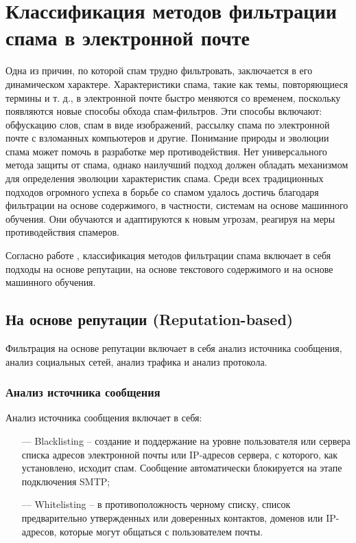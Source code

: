 \section{Классификация методов фильтрации спама в электронной почте}\label{Section:Filtering}

Одна из причин, по которой спам трудно фильтровать, заключается в
его динамическом характере. Характеристики спама, такие как темы,
повторяющиеся термины и т. д., в электронной почте быстро меняются
со временем, поскольку появляются новые способы обхода спам-фильтров.
Эти способы включают: обфускацию слов, спам в виде изображений,
рассылку спама по электронной почте с взломанных компьютеров и другие.
Понимание природы и эволюции спама может помочь в разработке мер
противодействия. Нет универсального метода защиты от спама, однако
наилучший подход должен обладать механизмом для определения эволюции
характеристик спама. Среди всех традиционных подходов огромного успеха
в борьбе со спамом удалось достичь благодаря фильтрации на основе
содержимого, в частности, системам на основе машинного обучения.
Они обучаются и адаптируются к новым угрозам, реагируя на меры
противодействия спамеров.

Согласно работе \cite{filters}, классификация методов фильтрации спама включает в себя подходы
на основе репутации, на основе текстового содержимого и на основе машинного обучения.

\subsection{На основе репутации (Reputation-based)}

Фильтрация на основе репутации включает в себя анализ источника сообщения, анализ социальных сетей,
анализ трафика и анализ протокола.

\subsubsection{Анализ источника сообщения}

Анализ источника сообщения включает в себя:

\begin{itemize}
    \item[—] Blacklisting -- создание и поддержание на уровне пользователя
        или сервера списка адресов электронной почты или IP-адресов сервера,
        с которого, как установлено, исходит спам. Сообщение автоматически
        блокируется на этапе подключения SMTP;
    \item[—] Whitelisting -- в противоположность черному списку, список
        предварительно утвержденных или доверенных контактов, доменов или
        IP-адресов, которые могут общаться с пользователем почты.
\end{itemize}


